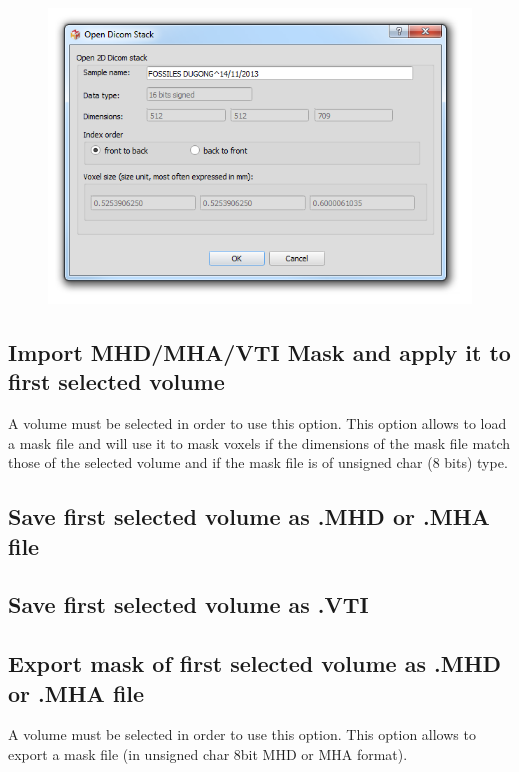 \begin{figure}
  \centering  
 \includegraphics[scale=0.5]{images/07/volume/open_dcm.png}
\label{open_dcm}
\end{figure}

\subsection{Import MHD/MHA/VTI Mask and apply it to first selected volume}
A volume must be selected in order to use this option. This option allows to load a mask file and will use it to mask voxels if the dimensions of the mask file match those of the selected volume and if the mask file is of unsigned char (8 bits) type.

\subsection{Save first selected volume as .MHD or .MHA file}


\subsection{Save first selected volume as .VTI}

\subsection{Export mask of first selected volume as .MHD or .MHA file}
A volume must be selected in order to use this option. This option allows to export a mask file (in unsigned char 8bit MHD or MHA format).
